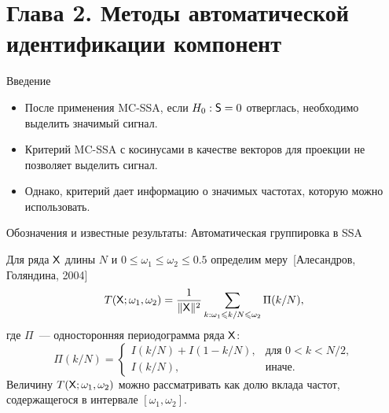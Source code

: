 \documentclass[pdf,notheorems,10pt,intlimits,unicode]{beamer}
\begin{document}
\section{Глава 2. Методы автоматической идентификации компонент}

\begin{frame}{Введение}

    \begin{itemize}
        \item После применения MC-SSA, если $H_0:\mathsf{S}=0$ отверглась, необходимо выделить значимый сигнал.\medskip
        \item Критерий MC-SSA с косинусами в качестве векторов для проекции не позволяет выделить сигнал.\medskip
        \item Однако, критерий дает информацию о значимых частотах, которую можно использовать. 
    \end{itemize}

\end{frame}

\begin{frame}{Обозначения и известные результаты: Автоматическая группировка в SSA}

    Для ряда $\mathsf{X}$ длины $N$ и $0\leqslant\omega_1\leqslant\omega_2\leqslant0.5$ определим меру~[Алесандров, Голяндина, 2004]
    $$
        T(\mathsf{X}; \omega_1,\omega_2)=\frac{1}{\|\mathsf{X}\|^2}\sum_{k:\omega_1\leqslant k / N \leqslant \omega_2}\Pi(k / N),
    $$
    где $\Pi$~--- односторонняя периодограмма ряда $\mathsf{X}$:
    \begin{equation*}
        \Pi(k / N)=
        \begin{cases}
            I(k / N) + I(1 - k / N), & \text{для } 0<k<N/2, \\
            I(k / N),                & \text{иначе}.
        \end{cases}
    \end{equation*}
    Величину $T(\mathsf{X}; \omega_1, \omega_2)$ можно рассматривать как долю вклада частот, содержащегося в интервале $[\omega_1, \omega_2]$.

\end{frame}
\end{document}
